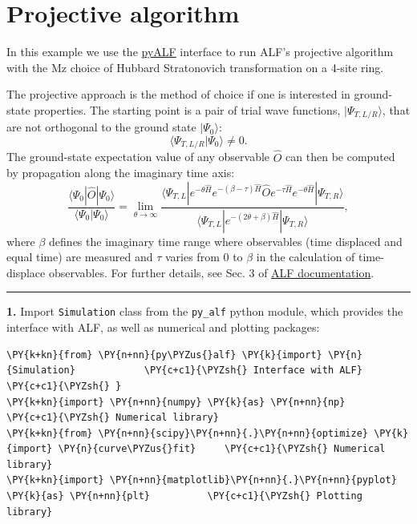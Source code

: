     
    

    
    \hypertarget{projective-algorithm}{%
\section{Projective algorithm}\label{projective-algorithm}}

    In this example we use the
\href{https://git.physik.uni-wuerzburg.de/ALF/pyALF}{pyALF} interface to
run ALF's projective algorithm with the Mz choice of Hubbard
Stratonovich transformation on a 4-site ring.

The projective approach is the method of choice if one is interested in
ground-state properties. The starting point is a pair of trial wave
functions, \(|\Psi_{T,L/R} \rangle\), that are not orthogonal to the
ground state \(|\Psi_0 \rangle\): \[
  \langle \Psi_{T,L/R}  | \Psi_0 \rangle  \neq 0. 
\] The ground-state expectation value of any observable \(\hat{O}\) can
then be computed by propagation along the imaginary time axis: \[
     \frac{ \langle \Psi_0 | \hat{O} | \Psi_0 \rangle }{ \langle \Psi_0 | \Psi_0 \rangle}   = \lim_{\theta \rightarrow \infty}  
     \frac{ \langle \Psi_{T,L} | e^{-\theta \hat{H}}  e^{-(\beta - \tau)\hat{H}  }\hat{O} e^{- \tau  \hat{H} }   e^{-\theta \hat{H}} | \Psi_{T,R} \rangle } 
            { \langle \Psi_{T,L} | e^{-(2 \theta + \beta) \hat{H}  } | \Psi_{T,R} \rangle } ,
\] where \(\beta\) defines the imaginary time range where observables
(time displaced and equal time) are measured and \(\tau\) varies from
\(0\) to \(\beta\) in the calculation of time-displace observables. For
further details, see Sec. 3 of
\href{https://git.physik.uni-wuerzburg.de/ALF/ALF_code/-/blob/master/Documentation/ALF_v1.0.pdf}{ALF
documentation}.

\begin{center}\rule{0.5\linewidth}{\linethickness}\end{center}

\textbf{1.} Import \texttt{Simulation} class from the \texttt{py\_alf}
python module, which provides the interface with ALF, as well as
numerical and plotting packages:

    \begin{tcolorbox}[breakable, size=fbox, boxrule=1pt, pad at break*=1mm,colback=cellbackground, colframe=cellborder]
\begin{Verbatim}[commandchars=\\\{\}]
\PY{k+kn}{from} \PY{n+nn}{py\PYZus{}alf} \PY{k}{import} \PY{n}{Simulation}            \PY{c+c1}{\PYZsh{} Interface with ALF}
\PY{c+c1}{\PYZsh{} }
\PY{k+kn}{import} \PY{n+nn}{numpy} \PY{k}{as} \PY{n+nn}{np}                       \PY{c+c1}{\PYZsh{} Numerical library}
\PY{k+kn}{from} \PY{n+nn}{scipy}\PY{n+nn}{.}\PY{n+nn}{optimize} \PY{k}{import} \PY{n}{curve\PYZus{}fit}     \PY{c+c1}{\PYZsh{} Numerical library}
\PY{k+kn}{import} \PY{n+nn}{matplotlib}\PY{n+nn}{.}\PY{n+nn}{pyplot} \PY{k}{as} \PY{n+nn}{plt}          \PY{c+c1}{\PYZsh{} Plotting library}
\end{Verbatim}
\end{tcolorbox}

